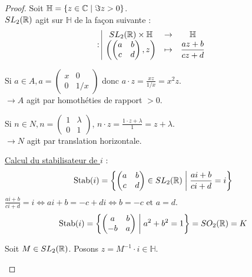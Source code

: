 \begin{proof}
    Soit $\mathbb{H} = \{ z \in \mathbb{C} \mid \Im z > 0 \}$. \\
    $SL_2(\mathbb{R})$ agit sur $\mathbb{H}$ de la façon suivante : 
    \[ 
        : \space \begin{array}{|ccc} \displaystyle SL_2(\mathbb{R}) \times \mathbb{H} & \to & \displaystyle \mathbb{H} \\ \displaystyle \left(\begin{pmatrix} a & b \\ c & d \end{pmatrix}, z\right) & \mapsto & \displaystyle \frac{az+b}{cz+d} \end{array} 
    \]

    Si $a \in A, a = \begin{pmatrix} x & 0 \\ 0 & 1/x \end{pmatrix}$ donc $a \cdot z = \frac{xz}{1/x} = x^2 z$. \\
    $\rightarrow A$ agit par homothéties de rapport $> 0$.

    Si $n \in N, n = \begin{pmatrix} 1 & \lambda \\ 0 & 1 \end{pmatrix}$, $n \cdot z = \frac{1 \cdot z + \lambda}{1} = z + \lambda$. \\
    $\rightarrow N$ agit par translation horizontale.

    \uline{Calcul du stabilisateur de $i$} :
    \[ \text{Stab}(i) = \left\{ \begin{pmatrix} a & b \\ c & d \end{pmatrix} \in SL_2(\mathbb{R}) \;\middle|\; \frac{ai+b}{ci+d} = i \right\} \]
    $\frac{ai+b}{ci+d} = i \iff ai+b = -c+di \iff b = -c \text{ et } a = d$.
    \[ 
        \text{Stab}(i) = \left\{ \begin{pmatrix} a & b \\ -b & a \end{pmatrix} \;\middle|\; a^2 + b^2 = 1 \right\} = SO_2(\mathbb{R}) = K 
    \]

    Soit $M \in SL_2(\mathbb{R})$. Posons $z = M^{-1} \cdot i \in \mathbb{H}$.

    \begin{center}
\end{center}
\end{proof}
